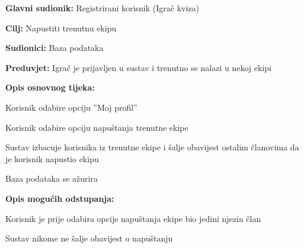 				
				\noindent {}
				\begin{packed_item}
					
					\item \textbf{Glavni sudionik:} Registrirani korisnik (Igrač kviza)
					\item  \textbf{Cilj:} Napustiti trenutnu ekipu
					\item  \textbf{Sudionici:} Baza podataka
					\item  \textbf{Preduvjet:} Igrač je prijavljen u sustav i trenutno se nalazi u nekoj ekipi
					\item  \textbf{Opis osnovnog tijeka:}
					
					\item[] \begin{packed_enum}
						
						\item Korisnik odabire opciju ”Moj profil”
						\item Korisnik odabire opciju napuštanja trenutne ekipe
						\item Sustav izbacuje korisnika iz trenutne ekipe i šalje obavijest ostalim članovima da je korisnik napustio ekipu
						\item Baza podataka se ažurira
						
					\end{packed_enum}
					
					\item  \textbf{Opis mogućih odstupanja:}
					
					\item[] \begin{packed_item}
						
						\item[3.a] Korisnik je prije odabira opcije napuštanja ekipe bio jedini njezin član
						\item[] \begin{packed_enum}
							
							\item Sustav nikome ne šalje obavijest o napuštanju
							
						\end{packed_enum}
						
					\end{packed_item}
				\end{packed_item}
				
